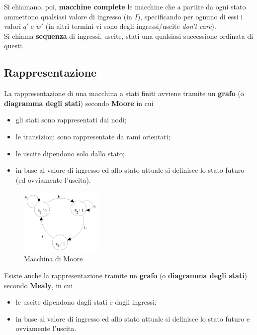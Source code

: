 \documentclass[a4paper]{extarticle}
\begin{document}
\vspace{1em}
\noindent
Si chiamano, poi, \textbf{macchine complete} le macchine che a partire da ogni stato ammettono qualsiasi valore di ingresso (in $I$), specificando per ognuno di essi i valori $q'$ e $w'$ (in altri termini vi sono degli ingressi/uscite \textit{don't care}).\\
Si chiama \textbf{sequenza} di ingressi, uscite, stati una qualsiasi successione ordinata di questi.

\vspace{1em}
\subsection{Rappresentazione}
La rappresentazione di una macchina a stati finiti avviene tramite un \textbf{grafo} (o \textbf{diagramma degli stati}) secondo \textbf{Moore} in cui
\begin{itemize}
    \item gli stati sono rappresentati dai nodi;
    \item le transizioni sono rappresentate da rami orientati;
    \item le uscite dipendono solo dallo stato;
    \item in base al valore di ingresso ed allo stato attuale si definisce lo stato futuro (ed ovviamente l'uscita).
\end{itemize}

\begin{figure}[H]
    \centering
    \includegraphics[width=0.35\textwidth]{macchina-moore.png}
    \caption{Macchina di Moore}
    \label{fig:macchina_moore}
\end{figure}

\vspace{1em}
\noindent
Esiste anche la rappresentazione tramite un \textbf{grafo} (o \textbf{diagramma degli stati}) secondo \textbf{Mealy}, in cui
\begin{itemize}
    \item le uscite dipendono dagli stati e dagli ingressi;
    \item in base al valore di ingresso ed allo stato attuale si definisce lo stato futuro e ovviamente l'uscita.
\end{itemize}
\end{document}
